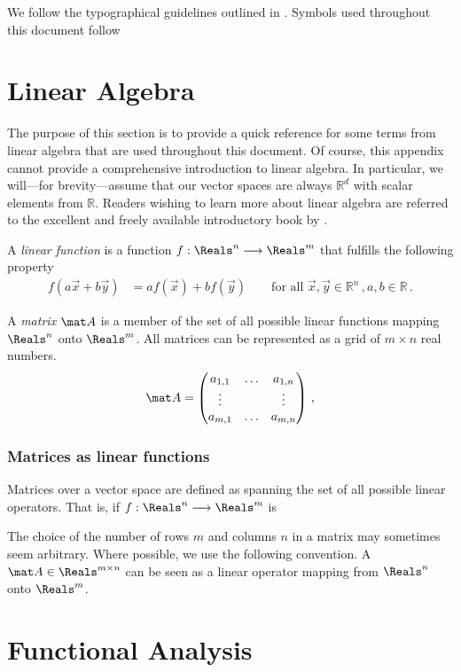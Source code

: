 We follow the typographical guidelines outlined in .
Symbols used throughout this document follow 

\section{Linear Algebra}
\label{app:linear_algebra}

The purpose of this section is to provide a quick reference for some terms from linear algebra that are used throughout this document.
Of course, this appendix cannot provide a comprehensive introduction to linear algebra.
In particular, we will---for brevity---assume that our vector spaces are always $\mathbb{R}^d$ with scalar elements from $\mathbb{R}$.
Readers wishing to learn more about linear algebra are referred to the excellent and freely available introductory book by \citet{hefferon2020linear}.

\begin{definition}
A \emph{linear function} is a function $f : \Reals^n \longrightarrow \Reals^{m}$ that fulfills the following property
\begin{align*}
	f(a \vec x + b \vec y) &= a f(\vec x) + b f(\vec y) \quad \quad \text{for all } \vec x, \vec y \in \mathbb{R}^n\,, a, b \in \mathbb{R} \,.
\end{align*}
\end{definition}

\begin{definition}[Matrix]
A \emph{matrix} $\mat A$ is a member of the set of all possible linear functions mapping $\Reals^n$ onto $\Reals^m$.
All matrices can be represented as a grid of $m \times n$ real numbers.
\begin{align*}
	\mat A = \begin{pmatrix}
		a_{1, 1} & \ldots & a_{1, n} \\
		\vdots & & \vdots \\
		a_{m, 1} & \ldots & a_{m, n}
	\end{pmatrix} \,,
\end{align*}
\end{definition}

\subsubsection{Matrices as linear functions}
Matrices over a vector space are defined as spanning the set of all possible linear operators.
That is, if $f : \Reals^n \longrightarrow \Reals^m$ is 

The choice of the number of rows $m$ and columns $n$ in a matrix may sometimes seem arbitrary.
Where possible, we use the following convention.
A $\mat A \in \Reals^{m \times n}$ can be seen as a linear operator mapping from $\Reals^{n}$ onto $\Reals^{m}$.


\section{Functional Analysis}
\label{app:functional_analysis}